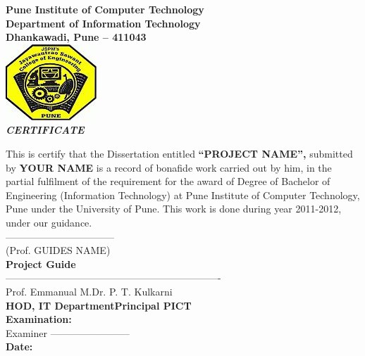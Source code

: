 \begin{center}
\thispagestyle{empty}

\LARGE{\textbf{Pune Institute of Computer Technology}} \\ 
\large{\textbf{Department of Information Technology}}\\
\large{\textbf{Dhankawadi, Pune – 411043}}\\[0.5cm]

\includegraphics[scale=0.5]{project/jscoe_logo}\\[0.5cm]

{\Huge \textbf{\emph{CERTIFICATE}}}\\[0.5cm]
\end{center}
\linespread{1.13}
\large{This is certify that the Dissertation entitled 
\textbf{``PROJECT NAME'',} 
submitted by 
\textbf{YOUR NAME}
 is a record of bonafide work carried out by him, in the partial
 fulfilment of the requirement for the award of Degree of Bachelor of
 Engineering (Information Technology) at Pune Institute of Computer
 Technology, Pune under the University of Pune. This work is done
 during year 2011-2012, under our guidance.}\\[1.0cm]
\large{---------------------------------}\\
\large{(Prof. GUIDES NAME)}\\[0.3cm]
\textbf{Project Guide}\\[1.0cm]
\large{--------------------------------}\hspace*{1.5in}\large{----------------------------------}\\
\large{Prof. Emmanual M.}\hspace*{2.0in}\large{Dr. P. T. Kulkarni}\\[0.3cm]
\textbf{HOD, IT Department}\hspace*{1.73in}\textbf{Principal PICT}\\[0.5cm]
\Large{\textbf{Examination:}}\\[0.8cm]
\large{Examiner ------------------------}\\[0.8cm]
\Large{\textbf{Date:}}
\newpage
